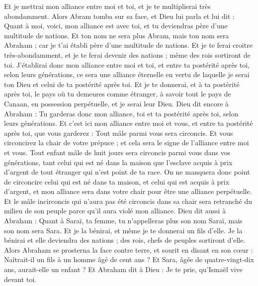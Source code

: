 \begin{multicols}{2}
Et je mettrai mon alliance entre moi et toi, et je te multiplierai très abondamment.
Alors Abram tomba sur sa face, et Dieu lui parla et lui dit :
Quant à moi, voici, mon alliance est avec toi, et tu deviendras père d'une multitude de nations.
Et ton nom ne sera plus Abram, mais ton nom sera Abraham ; car je t'ai établi père d'une multitude de nations.
Et je te ferai croitre très-abondamment, et je te ferai devenir des nations ; même des rois sortiront de toi.
J'établirai donc mon alliance entre moi et toi, et entre ta postérité après toi, selon leurs générations, ce sera une alliance éternelle en vertu de laquelle je serai ton Dieu et celui de ta postérité après toi.
Et je te donnerai, et à ta postérité après toi, le pays où tu demeures comme étranger, à savoir tout le pays de Canaan, en possession perpétuelle, et je serai leur Dieu.
Dieu dit encore à Abraham : Tu garderas donc mon alliance, toi et ta postérité après toi, selon leurs générations.
Et c'est ici mon alliance entre moi et vous, et entre ta postérité après toi, que vous garderez : Tout mâle parmi vous sera circoncis.
Et vous circoncirez la chair de votre prépuce ; et cela sera le signe de l'alliance entre moi et vous.
Tout enfant mâle de huit jours sera circoncis parmi vous dans vos générations, tant celui qui est né dans la maison que l'esclave acquis à prix d'argent de tout étranger qui n'est point de ta race.
On ne manquera donc point de circoncire celui qui est né dans ta maison, et celui qui est acquis à prix d'argent, et mon alliance sera dans votre chair pour être une alliance perpétuelle.
Et le mâle incirconcis qui n'aura pas été circoncis dans sa chair sera retranché du milieu de son peuple parce qu'il aura violé mon alliance.
Dieu dit aussi à Abraham : Quant à Saraï, ta femme, tu n'appelleras plus son nom Saraï, mais son nom sera Sara.
Et je la bénirai, et même je te donnerai un fils d'elle. Je la bénirai et elle deviendra des nations ; des rois, chefs de peuples sortiront d'elle.
Alors Abraham se prosterna la face contre terre, et sourit en disant en son cœur : Naîtrait-il un fils à un homme âgé de cent ans ? Et Sara, âgée de quatre-vingt-dix ans, aurait-elle un enfant ?
Et Abraham dit à Dieu : Je te prie, qu'Ismaël vive devant toi.

\end{multicols}
